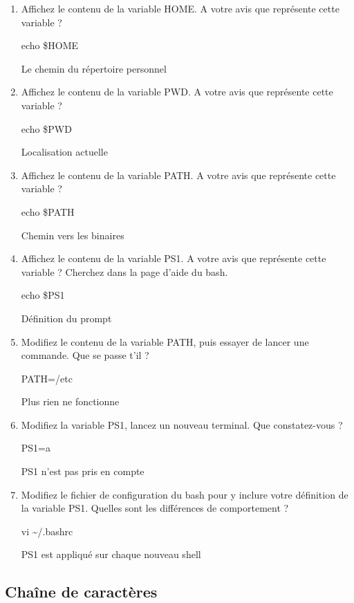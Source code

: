 \documentclass[11pt]{article}
\begin{document}
\begin{enumerate}
 \item Affichez le contenu de la variable HOME. A votre avis que représente cette variable ?
\begin{solution}
echo \$HOME

Le chemin du répertoire personnel
\end{solution}
 \item Affichez le contenu de la variable PWD. A votre avis que représente cette variable ?
\begin{solution}
echo \$PWD

Localisation actuelle
\end{solution}
 \item Affichez le contenu de la variable PATH. A votre avis que représente cette variable ?
\begin{solution}
echo \$PATH

Chemin vers les binaires
\end{solution}
 \item Affichez le contenu de la variable PS1. A votre avis que représente cette variable ? Cherchez dans la page d’aide du bash.
\begin{solution}
echo \$PS1

Définition du prompt
\end{solution}
 \item Modifiez le contenu de la variable PATH, puis essayer de lancer une commande. Que se passe t’il ?
\begin{solution}
PATH=/etc

Plus rien ne fonctionne
\end{solution}
 \item Modifiez la variable PS1, lancez un nouveau terminal. Que constatez-vous ?
\begin{solution}
PS1=a

PS1 n'est pas pris en compte
\end{solution}
 \item Modifiez le fichier de configuration du bash pour y inclure votre définition de la variable PS1. Quelles sont les différences de comportement ?
\begin{solution}
vi \textasciitilde{}/.bashrc

PS1 est appliqué sur chaque nouveau shell
\end{solution}
\end{enumerate}

\subsection{Chaîne de caractères}
\end{document}
